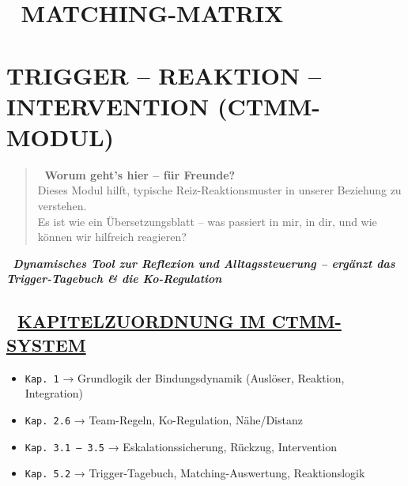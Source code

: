 %


\hypertarget{matching-matrix}{%
\section{\texorpdfstring{🧩 \textbf{MATCHING-MATRIX}}{🧩 MATCHING-MATRIX}}\label{matching-matrix}}

\hypertarget{trigger-reaktion-intervention-ctmm-modul}{%
\section{\texorpdfstring{\textbf{TRIGGER -- REAKTION -- INTERVENTION (CTMM-MODUL)}}{TRIGGER -- REAKTION -- INTERVENTION (CTMM-MODUL)}}\label{trigger-reaktion-intervention-ctmm-modul}}

\begin{quote}
🧠 \textbf{Worum geht's hier -- für Freunde?}\\
Dieses Modul hilft, typische Reiz-Reaktionsmuster in unserer Beziehung zu verstehen.\\
Es ist wie ein Übersetzungsblatt -- was passiert in mir, in dir, und wie können wir hilfreich reagieren?
\end{quote}

🧩 \emph{\textbf{Dynamisches Tool zur Reflexion und Alltagssteuerung -- ergänzt das Trigger-Tagebuch \& die Ko-Regulation}}

\hypertarget{section}{%
\subsection{}\label{section}}

\hypertarget{kapitelzuordnung-im-ctmm-system}{%
\subsection{\texorpdfstring{📘 \textbf{\ul{KAPITELZUORDNUNG IM CTMM-SYSTEM}}}{📘 KAPITELZUORDNUNG IM CTMM-SYSTEM}}\label{kapitelzuordnung-im-ctmm-system}}

\begin{itemize}
\tightlist
\item
  \texttt{Kap.\ }\texttt{1} → Grundlogik der Bindungsdynamik (Auslöser, Reaktion, Integration)
\item
  \texttt{Kap.\ }\texttt{2.6} → Team-Regeln, Ko-Regulation, Nähe/Distanz
\item
  \texttt{Kap.\ }\texttt{3.1\ –\ 3.5} → Eskalationssicherung, Rückzug, Intervention
\item
  \texttt{Kap.\ }\texttt{5.2} → Trigger-Tagebuch, Matching-Auswertung, Reaktionslogik
\end{itemize}

